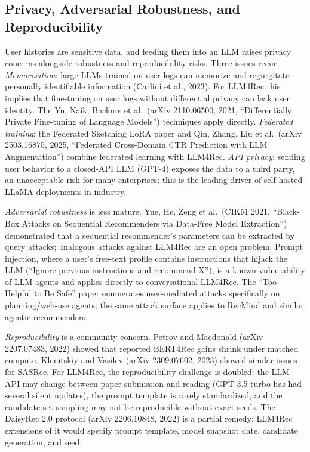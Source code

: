 \documentclass{article}
\begin{document}
\subsection{Privacy, Adversarial Robustness, and Reproducibility}\label{privacy-adversarial-robustness-and-reproducibility}

User histories are sensitive data, and feeding them into an LLM raises privacy concerns alongside robustness and reproducibility risks. Three issues recur. \emph{Memorization}: large LLMs trained on user logs can memorize and regurgitate personally identifiable information (Carlini et al., 2023). For LLM4Rec this implies that fine-tuning on user logs without differential privacy can leak user identity. The Yu, Naik, Backurs et al.~(arXiv 2110.06500, 2021, ``Differentially Private Fine-tuning of Language Models'') techniques apply directly. \emph{Federated training}: the Federated Sketching LoRA paper \citep{fang2025hidvaeinterpretabl} and Qin, Zhang, Liu et al.~(arXiv 2503.16875, 2025, ``Federated Cross-Domain CTR Prediction with LLM Augmentation'') combine federated learning with LLM4Rec. \emph{API privacy}: sending user behavior to a closed-API LLM (GPT-4) exposes the data to a third party, an unacceptable risk for many enterprises; this is the leading driver of self-hosted LLaMA deployments in industry.

\emph{Adversarial robustness} is less mature. Yue, He, Zeng et al.~(CIKM 2021, ``Black-Box Attacks on Sequential Recommenders via Data-Free Model Extraction'') demonstrated that a sequential recommender's parameters can be extracted by query attacks; analogous attacks against LLM4Rec are an open problem. Prompt injection, where a user's free-text profile contains instructions that hijack the LLM (``Ignore previous instructions and recommend X''), is a known vulnerability of LLM agents and applies directly to conversational LLM4Rec. The ``Too Helpful to Be Safe'' paper \citep{chen2026toohelpfultobesafe} enumerates user-mediated attacks specifically on planning/web-use agents; the same attack surface applies to RecMind and similar agentic recommenders.

\emph{Reproducibility} is a community concern. Petrov and Macdonald (arXiv 2207.07483, 2022) showed that reported BERT4Rec gains shrink under matched compute. Klenitskiy and Vasilev (arXiv 2309.07602, 2023) showed similar issues for SASRec. For LLM4Rec, the reproducibility challenge is doubled: the LLM API may change between paper submission and reading (GPT-3.5-turbo has had several silent updates), the prompt template is rarely standardized, and the candidate-set sampling may not be reproducible without exact seeds. The DaisyRec 2.0 protocol (arXiv 2206.10848, 2022) is a partial remedy; LLM4Rec extensions of it would specify prompt template, model snapshot date, candidate generation, and seed.
\end{document}
